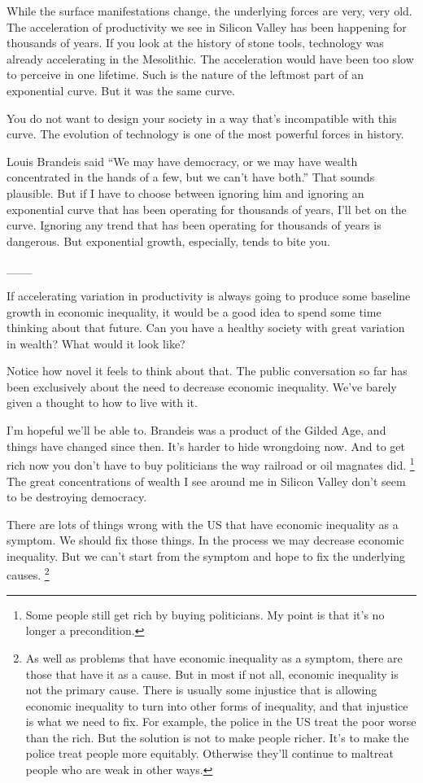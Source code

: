 While the surface manifestations change, the underlying forces are very,
very old. The acceleration of productivity we see in Silicon Valley has
been happening for thousands of years. If you look at the history of
stone tools, technology was already accelerating in the Mesolithic. The
acceleration would have been too slow to perceive in one lifetime. Such
is the nature of the leftmost part of an exponential curve. But it was
the same curve.

You do not want to design your society in a way that's incompatible with
this curve. The evolution of technology is one of the most powerful
forces in history.

Louis Brandeis said ``We may have democracy, or we may have wealth
concentrated in the hands of a few, but we can't have both.'' That
sounds plausible. But if I have to choose between ignoring him and
ignoring an exponential curve that has been operating for thousands of
years, I'll bet on the curve. Ignoring any trend that has been operating
for thousands of years is dangerous. But exponential growth, especially,
tends to bite you.

\_\_\_

If accelerating variation in productivity is always going to produce
some baseline growth in economic inequality, it would be a good idea to
spend some time thinking about that future. Can you have a healthy
society with great variation in wealth? What would it look like?

Notice how novel it feels to think about that. The public conversation
so far has been exclusively about the need to decrease economic
inequality. We've barely given a thought to how to live with it.

I'm hopeful we'll be able to. Brandeis was a product of the Gilded Age,
and things have changed since then. It's harder to hide wrongdoing now.
And to get rich now you don't have to buy politicians the way railroad
or oil magnates did. \footnote{Some people still get rich by buying politicians. My point is
that it's no longer a precondition.} The great concentrations of
wealth I see around me in Silicon Valley don't seem to be destroying
democracy.

There are lots of things wrong with the US that have economic inequality
as a symptom. We should fix those things. In the process we may decrease
economic inequality. But we can't start from the symptom and hope to fix
the underlying causes. \footnote{As well as problems that have economic inequality as a symptom,
there are those that have it as a cause. But in most if not all,
economic inequality is not the primary cause. There is usually some
injustice that is allowing economic inequality to turn into other forms
of inequality, and that injustice is what we need to fix. For example,
the police in the US treat the poor worse than the rich. But the
solution is not to make people richer. It's to make the police treat
people more equitably. Otherwise they'll continue to maltreat people who
are weak in other ways.}

